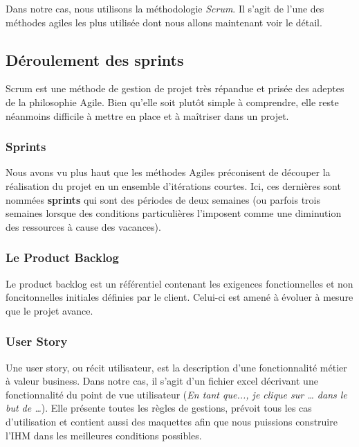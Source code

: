 	Dans notre cas, nous utilisons la méthodologie \textit{Scrum}. Il s'agit de l'une des méthodes agiles les plus utilisée dont nous allons maintenant voir le détail.

\subsection{Déroulement des sprints}
\label{deroulementSprint}

	Scrum est une méthode de gestion de projet très répandue et prisée des adeptes de la philosophie Agile. Bien qu'elle soit plutôt simple à comprendre, elle reste néanmoins difficile à mettre en place et à maîtriser dans un projet. \\
	
	\subsubsection{Sprints}
	Nous avons vu plus haut que les méthodes Agiles préconisent de découper la réalisation du projet en un ensemble d'itérations courtes. Ici, ces dernières sont nommées \textbf{sprints} qui sont des périodes de deux semaines (ou parfois trois semaines lorsque des conditions particulières l'imposent comme une diminution des ressources à cause des vacances).
	
	\subsubsection{Le Product Backlog}
	Le product backlog est un référentiel contenant les exigences fonctionnelles et non foncitonnelles initiales définies par le client. Celui-ci est amené à évoluer à mesure que le projet avance.
	
	\subsubsection{User Story}
	Une user story, ou récit utilisateur, est la description d'une fonctionnalité métier à valeur business. Dans notre cas, il s'agit d'un fichier excel décrivant une fonctionnalité du point de vue utilisateur (\textit{En tant que..., je clique sur … dans le but de …}). Elle présente toutes les règles de gestions, prévoit tous les cas d'utilisation et contient aussi des maquettes afin que nous puissions construire l'IHM dans les meilleures conditions possibles.
	
